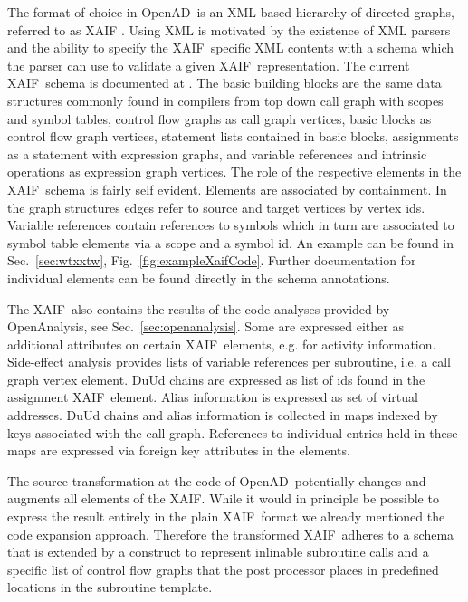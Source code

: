 \documentclass{book}
\newcommand{\OpenAD}{OpenAD}
\newcommand{\OpenAnalysis}{OpenAnalysis}
\newcommand{\xaif}{XAIF}
\newcommand{\refsec}[1]{{Sec.~\ref{#1}}}
\newcommand{\reffig}[1]{{Fig.~\ref{#1}}}
\begin{document}
The format of choice in \OpenAD\ is an XML-based \cite{xmlWeb} hierarchy of 
directed graphs, referred to as \xaif 
\cite{HNN02}. Using XML is motivated by the existence of XML parsers and 
the ability to specify the \xaif\ specific XML contents with a schema which 
the parser can use to validate a given \xaif\ representation. 
The current \xaif\ schema is documented at \cite{xaifweb}.
The basic building blocks are the same data structures commonly found 
in compilers from top down call graph with scopes and symbol tables, 
control flow graphs as call graph vertices, basic blocks  as control flow 
graph vertices, statement lists contained in basic blocks, 
assignments as a statement with expression graphs,  and variable references 
and intrinsic operations as expression graph vertices. 
The role of the respective elements in the \xaif\ schema is fairly self evident. 
Elements are associated by containment. In the graph structures edges 
refer to source and target vertices by vertex ids. 
Variable references contain references to symbols which in turn 
are associated to symbol table elements via a scope and a symbol id. 
An example can be found in \refsec{sec:wtxxtw}, \reffig{fig:exampleXaifCode}.
Further documentation for individual elements can be found directly in the 
schema annotations. 

The \xaif\ also contains the results of the code analyses provided 
by \OpenAnalysis, see \refsec{sec:openanalysis}. Some are expressed 
either as additional attributes on certain \xaif\ elements, e.g. for activity information. 
Side-effect analysis provides lists of variable references per subroutine, i.e. a call graph vertex element.
DuUd chains are expressed as list of ids found in the assignment \xaif\ element.
Alias information is expressed as set of virtual addresses. 
DuUd chains and alias information is collected in maps indexed by keys associated with the call 
graph. References to individual entries held in these maps are expressed via foreign key 
attributes in the elements. 

The source transformation at the code of \OpenAD\ potentially changes and augments 
all elements of the \xaif. While it would in principle be possible  
to express the result entirely in the plain \xaif\ format we already mentioned the 
code expansion approach. Therefore the transformed \xaif\ adheres to a schema 
that is extended by a construct to represent inlinable subroutine calls and 
a specific list of control flow graphs that the post processor places in predefined 
locations in the subroutine template.    
\end{document}
